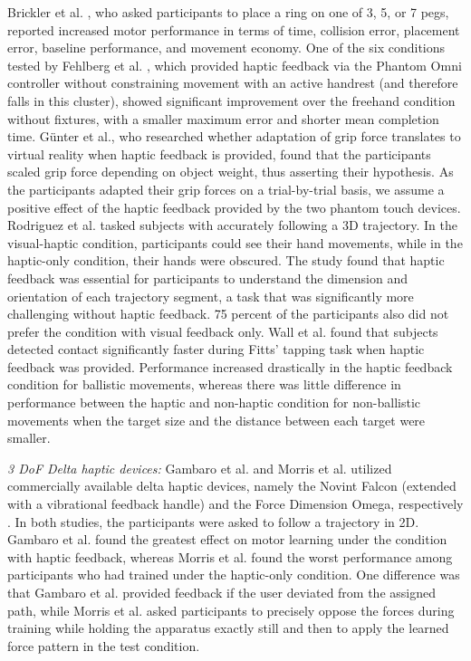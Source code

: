 Brickler et al. \cite{Brickler2019}, who asked participants to place a ring on one of 3, 5, or 7 pegs, reported increased motor performance in terms of time, collision error, placement error, baseline performance, and movement economy. One of the six conditions tested by Fehlberg et al. \cite{Fehlberg2012}, which provided haptic feedback via the Phantom Omni controller without constraining movement with an active handrest (and therefore falls in this cluster), showed significant improvement over the freehand condition without fixtures, with a smaller maximum error and shorter mean completion time. Günter et al., who researched whether adaptation of grip force translates to virtual reality when haptic feedback is provided, found that the participants scaled grip force depending on object weight, thus asserting their hypothesis. As the participants adapted their grip forces on a trial-by-trial basis, we assume a positive effect of the haptic feedback provided by the two phantom touch devices. 
Rodriguez et al. \cite{Rodriguez2010} tasked subjects with accurately following a 3D trajectory. In the visual-haptic condition, participants could see their hand movements, while in the haptic-only condition, their hands were obscured. The study found that haptic feedback was essential for participants to understand the dimension and orientation of each trajectory segment, a task that was significantly more challenging without haptic feedback. 75 percent of the participants also did not prefer the condition with visual feedback only. Wall et al. \cite{Wall2000} found that subjects detected contact significantly faster during Fitts' tapping task when haptic feedback was provided. Performance increased drastically in the haptic feedback condition for ballistic movements, whereas there was little difference in performance between the haptic and non-haptic condition for non-ballistic movements when the target size and the distance between each target were smaller.

\textit{3 DoF Delta haptic devices:} Gambaro et al. and Morris et al. utilized commercially available delta haptic devices, namely the Novint Falcon (extended with a vibrational feedback handle) and the Force Dimension Omega, respectively \cite{Gambaro2014, Morris2007}. In both studies, the participants were asked to follow a trajectory in 2D. Gambaro et al. found the greatest effect on motor learning under the condition with haptic feedback, whereas Morris et al. found the worst performance among participants who had trained under the haptic-only condition. One difference was that Gambaro et al. provided feedback if the user deviated from the assigned path, while Morris et al. asked participants to precisely oppose the forces during training while holding the apparatus exactly still and then to apply the learned force pattern in the test condition. 

